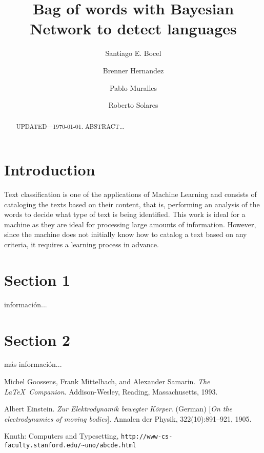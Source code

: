 \documentclass{acmart}
\title{Bag of words with Bayesian Network to detect languages}
\author{Santiago E. Bocel}
\author{Brenner Hernandez}
\author{Pablo Muralles}
\author{Roberto Solares}
\affiliation{%
    \institution{Universidad Rafael Landívar}
    \postcode{01016}
    \city{Guatemala City}
    \country{Guatemala}}
\begin{document}
    \begin{abstract}
    UPDATED---\today. ABSTRACT...
    \end{abstract}

    \maketitle

    \section{Introduction}
    Text classification is one of the applications of Machine Learning and consists of cataloging the texts based on their content, that is, performing an analysis of the words to decide what type of text is being identified.
    \newline
    \newline
    This work is ideal for a machine as they are ideal for processing large amounts of information. However, since the machine does not initially know how to catalog a text based on any criteria, it requires a learning process in advance.
    \newline
    
    
    

    \section{Section 1}
    información...

    \section{Section 2}
    más información...

    \begin{thebibliography}{9}

    Michel Goossens, Frank Mittelbach, and Alexander Samarin. 
    \textit{The \LaTeX\ Companion}. 
    Addison-Wesley, Reading, Massachusetts, 1993.

    Albert Einstein. 
    \textit{Zur Elektrodynamik bewegter K{\"o}rper}. (German) 
    [\textit{On the electrodynamics of moving bodies}]. 
    Annalen der Physik, 322(10):891–921, 1905.

    Knuth: Computers and Typesetting,
    \texttt{http://www-cs-faculty.stanford.edu/\~{}uno/abcde.html}
    \end{thebibliography}
\end{document}
